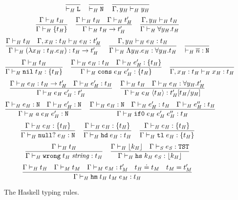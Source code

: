 \begin{figure}[p]
\caption{The Haskell typing rules.}
\[
\frac
{}
{ \vdash_{\mathit{H}} \mathtt{L}}
\quad
\frac
{}
{ \vdash_{\mathit{H}} \mathtt{N}}
\quad
\frac
{}
{\Gamma , y_{\mathit{H}} \vdash_{\mathit{H}} y_{\mathit{H}}}
\]
\[
\frac
{\Gamma \vdash_{\mathit{H}} t_{\mathit{H}}}
{\Gamma \vdash_{\mathit{H}} \lbrace t_{\mathit{H}} \rbrace}
\quad
\frac
{\Gamma \vdash_{\mathit{H}} t_{\mathit{H}} \quad \Gamma \vdash_{\mathit{H}} t_{\mathit{H}}'}
{\Gamma \vdash_{\mathit{H}} t_{\mathit{H}} \rightarrow t_{\mathit{H}}'}
\quad
\frac
{\Gamma, y_{\mathit{H}} \vdash_{\mathit{H}} t_{\mathit{H}}}
{\Gamma \vdash_{\mathit{H}} \forall y_{\mathit{H}} . t_{\mathit{H}}}
\]
\bigskip
\[
\frac
{\Gamma \vdash_{\mathit{H}} t_{\mathit{H}} \quad \Gamma , x_{\mathit{H}} : t_{\mathit{H}} \vdash_{\mathit{H}} e_{\mathit{H}} : t_{\mathit{H}}'}
{\Gamma \vdash_{\mathit{H}} (\lambda x_{\mathit{H}} : t_{\mathit{H}} . e_{\mathit{H}}) : t_{\mathit{H}} \rightarrow t_{\mathit{H}}'}
\quad
\frac
{\Gamma , y_{\mathit{H}} \vdash_{\mathit{H}} e_{\mathit{H}} : t_{\mathit{H}}}
{\Gamma \vdash_{\mathit{H}} \Lambda y_{\mathit{H}} . e_{\mathit{H}} : \forall y_{\mathit{H}} . t_{\mathit{H}}}
\quad
\frac
{}
{ \vdash_{\mathit{H}} \overline{n} : \mathtt{N}}
\]
\[
\frac
{\Gamma \vdash_{\mathit{H}} t_{\mathit{H}}}
{\Gamma \vdash_{\mathit{H}} \mathtt{nil} \; t_{\mathit{H}} : \lbrace t_{\mathit{H}} \rbrace}
\quad
\frac
{\Gamma \vdash_{\mathit{H}} e_{\mathit{H}} : t_{\mathit{H}} \quad \Gamma \vdash_{\mathit{H}} e_{\mathit{H}}' : \lbrace t_{\mathit{H}} \rbrace}
{\Gamma \vdash_{\mathit{H}} \mathtt{cons} \; e_{\mathit{H}} \; e_{\mathit{H}}' : \lbrace t_{\mathit{H}} \rbrace}
\quad
\frac
{}
{\Gamma , x_{\mathit{H}} : t_{\mathit{H}} \vdash_{\mathit{H}} x_{\mathit{H}} : t_{\mathit{H}}}
\]
\[
\frac
{\Gamma \vdash_{\mathit{H}} e_{\mathit{H}} : t_{\mathit{H}} \rightarrow t_{\mathit{H}}' \quad \Gamma \vdash_{\mathit{H}} e_{\mathit{H}}' : t_{\mathit{H}}}
{\Gamma\vdash_{\mathit{H}}e_{\mathit{H}} \; e_{\mathit{H}}':t_{\mathit{H}}'}
\quad
\frac
{\Gamma \vdash_{\mathit{H}} t_{\mathit{H}} \quad \Gamma \vdash_{\mathit{H}} e_{\mathit{H}} : \forall y_{\mathit{H}} . t_{\mathit{H}}'}
{\Gamma \vdash_{\mathit{H}} e_{\mathit{H}} \; \langle t_{\mathit{H}} \rangle : t_{\mathit{H}}'[t_{\mathit{H}}/y_{\mathit{H}}]}
\]
\[
\frac
{\Gamma \vdash_{\mathit{H}} e_{\mathit{H}} : \mathtt{N} \quad \Gamma \vdash_{\mathit{H}} e_{\mathit{H}}' : \mathtt{N}}
{\Gamma \vdash_{\mathit{H}} \mathit{a} \; e_{\mathit{H}} \; e_{\mathit{H}}' : \mathtt{N}}
\quad
\frac
{\Gamma \vdash_{\mathit{H}} e_{\mathit{H}} : \mathtt{N} \quad \Gamma \vdash_{\mathit{H}} e_{\mathit{H}}' : t_{\mathit{H}} \quad \Gamma \vdash_{\mathit{H}} e_{\mathit{H}}'' : t_{\mathit{H}}}
{\Gamma \vdash_{\mathit{H}} \mathtt{if0} \; e_{\mathit{H}} \; e_{\mathit{H}}' \; e_{\mathit{H}}'' : t_{\mathit{H}}}
\]
\[
\frac
{\Gamma \vdash_{\mathit{H}} e_{\mathit{H}} : \lbrace t_{\mathit{H}} \rbrace}
{\Gamma \vdash_{\mathit{H}} \mathtt{null?} \; e_{\mathit{H}} : \mathtt{N}}
\quad
\frac
{\Gamma \vdash_{\mathit{H}} e_{\mathit{H}} : \lbrace t_{\mathit{H}} \rbrace}
{\Gamma \vdash_{\mathit{H}} \mathtt{hd} \; e_{\mathit{H}} : t_{\mathit{H}}}
\quad
\frac
{\Gamma \vdash_{\mathit{H}} e_{\mathit{H}} : \lbrace t_{\mathit{H}} \rbrace}
{\Gamma \vdash_{\mathit{H}} \mathtt{tl} \; e_{\mathit{H}} : \lbrace t_{\mathit{H}} \rbrace}
\]
\[
\frac
{\Gamma \vdash_{\mathit{H}} t_{\mathit{H}}}
{\Gamma \vdash_{\mathit{H}} \mathtt{wrong} \; t_{\mathit{H}} \; \mathit{string} : t_{\mathit{H}}}
\quad
\frac
{\Gamma \vdash_{\mathit{H}} \lfloor k_{\mathit{H}} \rfloor \quad \Gamma \vdash_{\mathit{S}} e_{\mathit{S}} : \mathtt{TST}}
{\Gamma \vdash_{\mathit{H}} \mathtt{hs} \; k_{\mathit{H}} \; e_{\mathit{S}} : \lfloor k_{\mathit{H}} \rfloor}
\]
\[
\frac
{\Gamma \vdash_{\mathit{H}} t_{\mathit{H}} \quad \Gamma \vdash_{\mathit{M}} t_{\mathit{M}} \quad \Gamma \vdash_{\mathit{M}} e_{\mathit{M}} : t_{\mathit{M}}' \quad t_{\mathit{H}} \doteq t_{\mathit{M}} \quad t_{\mathit{M}} = t_{\mathit{M}}'}
{\Gamma \vdash_{\mathit{H}} \mathtt{hm} \; t_{\mathit{H}} \; t_{\mathit{M}} \; e_{\mathit{M}} : t_{\mathit{H}}}
\]
\label{fightr}
\end{figure}